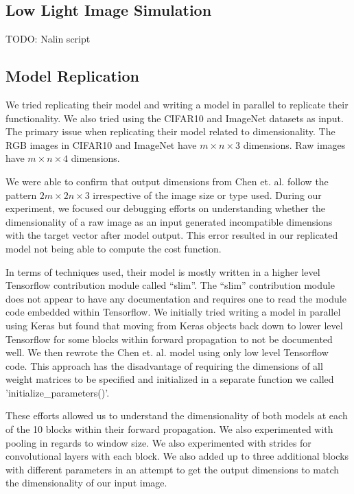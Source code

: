 \documentclass{article}
\begin{document}
\subsection{Low Light Image Simulation}

TODO: Nalin script

\subsection{Model Replication}

We tried replicating their model and writing a model in parallel to
replicate their functionality. We also tried using the CIFAR10 and
ImageNet datasets as input. The primary issue when replicating their
model related to dimensionality. The RGB images in CIFAR10 and ImageNet
have $m \times n \times 3$ dimensions. Raw images have $m \times n \times 4$
dimensions.

We were able to confirm that output dimensions from Chen et. al.
\cite{chen2018learning} follow the pattern $2m \times 2n \times 3$
irrespective of the image size or type used. During our experiment,
we focused our debugging efforts on understanding whether the dimensionality
of a raw image as an input generated incompatible dimensions with the
target vector after model output. This error resulted in our replicated
model not being able to compute the cost function.

In terms of techniques used, their model is mostly written in a higher
level Tensorflow contribution module called ``slim''. The ``slim''
contribution module does not appear to have any documentation and requires
one to read the module code embedded within Tensorflow. We initially tried
writing a model in parallel using Keras but found that moving from Keras
objects back down to lower level Tensorflow for some blocks within
forward propagation to not be documented well. We then rewrote the
Chen et. al. \cite{chen2018learning} model using only low level Tensorflow
code. This approach has the disadvantage of requiring the dimensions of
all weight matrices to be specified and initialized in a separate function
we called 'initialize\_parameters()'.

These efforts allowed us to understand the dimensionality of both models
at each of the 10 blocks within their forward propagation. We also
experimented with pooling in regards to window size. We also experimented
with strides for convolutional layers with each block. We also added up
to three additional blocks with different parameters in an attempt to
get the output dimensions to match the dimensionality of our input image.
\end{document}
